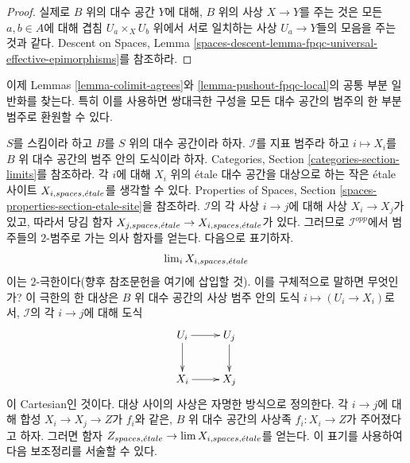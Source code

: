\begin{proof}
실제로 $B$ 위의 대수 공간 $Y$에 대해, $B$ 위의 사상 $X \to Y$를
주는 것은 모든 $a, b \in A$에 대해 겹침 $U_a \times_X U_b$ 위에서
서로 일치하는 사상 $U_a \to Y$들의 모음을 주는 것과 같다.
Descent on Spaces, Lemma
\ref{spaces-descent-lemma-fpqc-universal-effective-epimorphisms}를
참조하라.
\end{proof}

\noindent
이제 Lemmas \ref{lemma-colimit-agrees}와
\ref{lemma-pushout-fpqc-local}의 공통 부분 일반화를 찾는다.
특히 이를 사용하면 쌍대극한 구성을 모든 대수 공간의 범주의
한 부분범주로 환원할 수 있다.

\medskip\noindent
$S$를 스킴이라 하고 $B$를 $S$ 위의 대수 공간이라 하자.
$\mathcal{I}$를 지표 범주라 하고 $i \mapsto X_i$를
$B$ 위 대수 공간의 범주 안의 도식이라 하자.
Categories, Section \ref{categories-section-limits}를 참조하라.
각 $i$에 대해 $X_i$ 위의 \'etale 대수 공간을 대상으로 하는 작은 \'etale 사이트
$X_{i, spaces, {\acute{e}tale}}$를 생각할 수 있다.
Properties of Spaces, Section
\ref{spaces-properties-section-etale-site}을 참조하라.
$\mathcal{I}$의 각 사상 $i \to j$에 대해 사상 $X_i \to X_j$가 있고,
따라서 당김 함자
$X_{j, spaces, {\acute{e}tale}} \to X_{i, spaces, {\acute{e}tale}}$가 있다.
그러므로 $\mathcal{I}^{opp}$에서 범주들의 $2$-범주로 가는
의사 함자를 얻는다. 다음으로 표기하자.
$$
\mathop{\mathrm{lim}}\nolimits_i X_{i, spaces, {\acute{e}tale}}
$$
이는 $2$-극한이다(향후 참조문헌을 여기에 삽입할 것).
이를 구체적으로 말하면 무엇인가? 이 극한의 한 대상은
$B$ 위 대수 공간의 사상 범주 안의 도식
$i \mapsto (U_i \to X_i)$로서, $\mathcal{I}$의 각 $i \to j$에 대해
도식
$$
\xymatrix{
U_i \ar[r] \ar[d] & U_j \ar[d] \\
X_i \ar[r] & X_j
}
$$
이 Cartesian인 것이다. 대상 사이의 사상은 자명한 방식으로 정의한다.
각 $i \to j$에 대해 합성 $X_i \to X_j \to Z$가 $f_i$와 같은,
$B$ 위 대수 공간의 사상족 $f_i : X_i \to Z$가 주어졌다고 하자.
그러면 함자
$Z_{spaces, {\acute{e}tale}} \to \mathop{\mathrm{lim}}\nolimits X_{i, spaces, {\acute{e}tale}}$를 얻는다.
이 표기를 사용하여 다음 보조정리를 서술할 수 있다.

